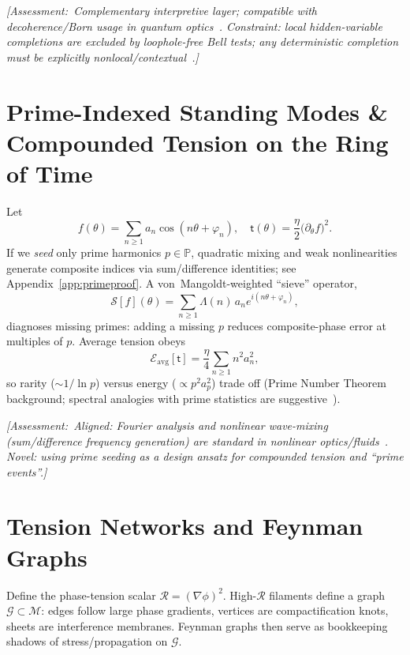 \documentclass[reprint,amsmath,amssymb,aps,pra]{revtex4-2} %
\newcommand{\Primes}{\mathbb{P}}              %
\newcommand{\M}{\mathcal{M}}                   %
\newcommand{\R}{\mathcal{R}}                   %
\newcommand{\Eavg}{\mathcal{E}_{\!\mathrm{avg}}}
\newcommand{\taufield}{\mathsf{t}}             %
\newcommand{\Assessment}[1]{\par\smallskip\noindent\textit{\color{blue}[Assessment:\ #1]}\par\smallskip}
\begin{document}
\Assessment{Complementary interpretive layer; compatible with decoherence/Born usage in quantum optics~\cite{MandelWolf1995}. Constraint: local hidden-variable completions are excluded by loophole-free Bell tests; any deterministic completion must be explicitly nonlocal/contextual~\cite{Hensen2015,Giustina2015,Shalm2015,Bohm1952}.}

\section{Prime-Indexed Standing Modes \& Compounded Tension on the Ring of Time}
Let
  \begin{equation}
    f(\theta)=\sum_{n\ge1} a_n \cos{(n\theta+\varphi_n)},\quad
    \taufield{(\theta)}=\frac{\eta}{2}\big(\partial_\theta f\big)^2.
  \label{eq:fourier-tension}
\end{equation}
If we \emph{seed} only prime harmonics $p\in\Primes$, quadratic mixing and weak nonlinearities generate composite indices via sum/difference identities; see Appendix~\ref{app:primeproof}. A von~Mangoldt-weighted ``sieve'' operator,
\begin{equation}
\mathcal{S}[f](\theta)=\sum_{n\ge1}\Lambda(n)\, a_n e^{i(n\theta+\varphi_n)},
  \label{eq:vonmangoldt}
\end{equation}
diagnoses missing primes: adding a missing $p$ reduces composite-phase error at multiples of $p$. Average tension obeys
\begin{equation}
\Eavg[\taufield]=\frac{\eta}{4}\sum_{n\ge1} n^2 a_n^2,
  \label{eq:avg-tension}
\end{equation}
so rarity ($\sim 1/\ln p$) versus energy ($\propto p^2 a_p^2$) trade off (Prime Number Theorem background; spectral analogies with prime statistics are suggestive~\cite{Montgomery1973,BerryKeating1999}).

\Assessment{Aligned: Fourier analysis and nonlinear wave-mixing (sum/difference frequency generation) are standard in nonlinear optics/fluids~\cite{BoydNLO}. Novel: using prime seeding as a \emph{design ansatz} for compounded tension and ``prime events''.}

\section{Tension Networks and Feynman Graphs}
Define the phase-tension scalar $\R = (\nabla\phi)^2$. High-$\R$ filaments define a graph $\mathcal{G}\subset\M$: edges follow large phase gradients, vertices are compactification knots, sheets are interference membranes. Feynman graphs then serve as bookkeeping shadows of stress/propagation on $\mathcal{G}$.
\end{document}
